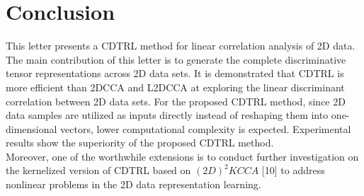 \documentclass[journal]{IEEEtran}
\begin{document}
\section{Conclusion}
This letter presents a CDTRL method for linear correlation analysis of 2D data. The main contribution of this letter is to generate the complete discriminative tensor representations across 2D data sets. It is demonstrated that CDTRL is more efficient than 2DCCA and L2DCCA at exploring the linear discriminant correlation between 2D data sets. For the proposed CDTRL method, since 2D data samples are utilized as inputs directly instead of reshaping them into one-dimensional vectors, lower computational complexity is expected. Experimental results show the superiority of the proposed CDTRL method.\\\indent Moreover, one of the worthwhile extensions is to conduct further investigation on the kernelized version of CDTRL based on $(2D)^2KCCA$ [10] to address nonlinear problems in the 2D data representation learning.















\ifCLASSOPTIONcaptionsoff
  \newpage
\fi



\end{document}
